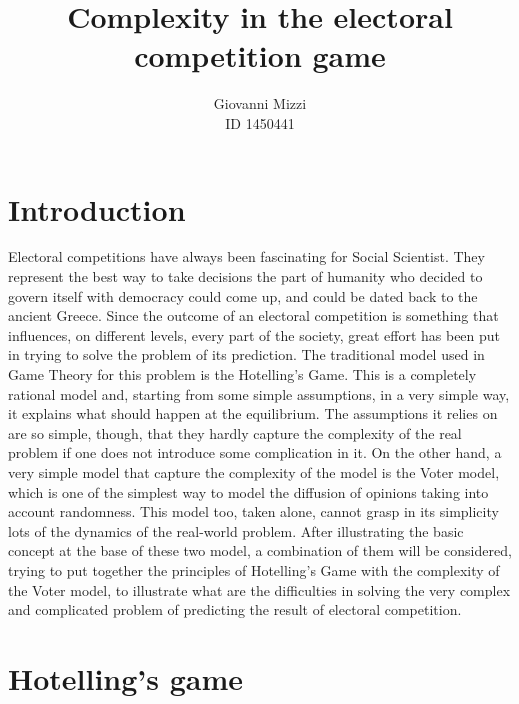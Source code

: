 \documentclass[11pt,a4paper,twocolumn]{article}
\author{Giovanni Mizzi \\ID 1450441}
\title{\textbf{Complexity in the electoral competition game}}
\begin{document}
\maketitle

\section*{Introduction}
\vspace*{-0.2cm}
Electoral competitions have always been fascinating for Social Scientist. They represent the best way to take decisions the part of humanity who decided to govern itself with democracy could come up, and could be dated back to the ancient Greece. Since the outcome of an electoral competition is something that influences, on different levels, every part of the society, great effort has been put in trying to solve the problem of its prediction.
The traditional model used in Game Theory for this problem is the Hotelling's Game. This is a completely rational model and, starting from some simple assumptions, in a very simple way, it explains what should happen at the equilibrium. The assumptions it relies on are so simple, though, that they hardly capture the complexity of the real problem if one does not introduce some complication in it.
On the other hand, a very simple model that capture the complexity of the model is the Voter model, which is one of the simplest way to model the diffusion of opinions taking into account randomness. This model too, taken alone, cannot grasp in its simplicity lots of the dynamics of the real-world problem.
After illustrating the basic concept at the base of these two model, a combination of them will be considered, trying to put together the principles of Hotelling's Game with the complexity of the Voter model, to illustrate what are the difficulties in solving the very complex and complicated problem of predicting the result of electoral competition.

\section*{Hotelling's game}
\vspace*{-0.2cm}
\end{document}
